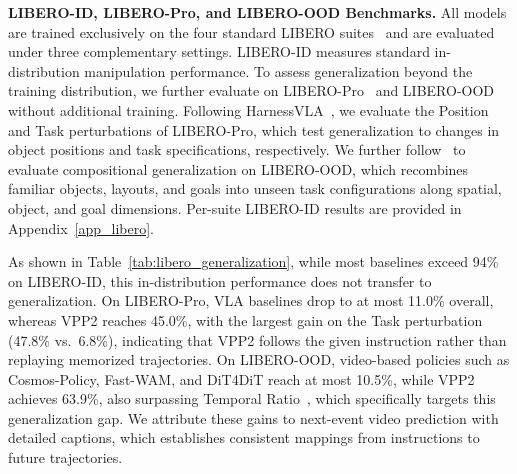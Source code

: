 \begin{table}[t]
\centering
\setlength{\tabcolsep}{4pt}
\caption{Post-training results on the RoboDojo simulation benchmark. Average score captures partial task progress, and success rate measures binary task completion; both are averaged over the five capability dimensions. Baseline results are taken from the official leaderboard.}
\label{tab:robodojo}
\end{table}

\textbf{LIBERO-ID, LIBERO-Pro, and LIBERO-OOD Benchmarks.}
All models are trained exclusively on the four standard LIBERO suites~\citep{liu2023libero} and are evaluated under three complementary settings. LIBERO-ID measures standard in-distribution manipulation performance. To assess generalization beyond the training distribution, we further evaluate on LIBERO-Pro~\citep{zhou2025liberopro} and LIBERO-OOD~\citep{li2025vlas} without additional training. Following HarnessVLA~\citep{zhang2026harness}, we evaluate the Position and Task perturbations of LIBERO-Pro, which test generalization to changes in object positions and task specifications, respectively. We further follow~\citep{mishra2026understanding} to evaluate compositional generalization on LIBERO-OOD, which recombines familiar objects, layouts, and goals into unseen task configurations along spatial, object, and goal dimensions. Per-suite LIBERO-ID results are provided in Appendix~\ref{app_libero}.

As shown in Table~\ref{tab:libero_generalization}, while most baselines exceed 94\% on LIBERO-ID, this in-distribution performance does not transfer to generalization. On LIBERO-Pro, VLA baselines drop to at most 11.0\% overall, whereas VPP2 reaches 45.0\%, with the largest gain on the Task perturbation (47.8\% vs.\ 6.8\%), indicating that VPP2 follows the given instruction rather than replaying memorized trajectories. On LIBERO-OOD, video-based policies such as Cosmos-Policy, Fast-WAM, and DiT4DiT reach at most 10.5\%, while VPP2 achieves 63.9\%, also surpassing Temporal Ratio~\citep{mishra2026understanding}, which specifically targets this generalization gap. We attribute these gains to next-event video prediction with detailed captions, which establishes consistent mappings from instructions to future trajectories.

